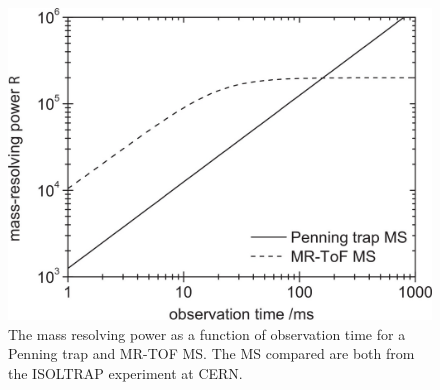 
\begin{figure}[H]
    \centering
    \includegraphics[width=.5\textwidth]{images/MS_PTMRTOF_graph.jpg}
    \caption{The mass resolving power as a function of observation time for a Penning trap and MR-TOF MS. The MS compared are both from the ISOLTRAP experiment at CERN.
    \cite{wolf_isoltraps_2013}}\label{fig:MSPTMRTOF}
\end{figure}